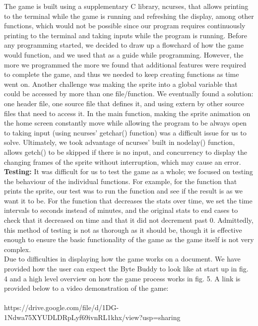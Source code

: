 \documentclass[11pt]{article}
\begin{document}
The game is built using a supplementary C library, ncurses, that allows printing to the terminal while the game is running and refreshing the display, among other functions, which would not be possible since our program requires continuously printing to the terminal and taking inputs while the program is running.
Before any programming started, we decided to draw up a flowchard of how the game would function, and we used that as a guide while programming. However, the more we programmed the more we found that additional features were required to complete the game, and thus we needed to keep creating functions as time went on.
Another challenge was making the sprite into a global variable that could be accessed by more than one file/function. We eventually found a solution: one header file, one source file that defines it, and using extern by other source files that need to access it.
In the main function, making the sprite animation on the home screen constantly move while allowing the program to be always open to taking input (using ncurses’ getchar() function) was a difficult issue for us to solve. Ultimately, we took advantage of ncurses’ built in nodelay() function, allows getch() to be skipped if there is no input, and concurrency to display the changing frames of the sprite without interruption, which may cause an error.\\
\textbf{Testing: }
It was difficult for us to test the game as a whole; we focused on testing the behaviour of the individual functions. For example, for the function that prints the sprite, our test was to run the function and see if the result is as we want it to be. For the function that decreases the stats over time, we set the time intervals to seconds instead of minutes, and the original stats to end cases to check that it decreased on time and that it did not decrement past 0.
Admittedly, this method of testing is not as thorough as it should be, though it is effective enough to ensure the basic functionality of the game as the game itself is not very complex.\\
Due to difficulties in displaying how the game works on a document. We have provided how the user can expect the Byte Buddy to look like at start up in fig. 4 and a high level overview on how the game process works in fig. 5. A link is provided below to a video demonstration of the game:\\\\
https://drive.google.com/file/d/1DG-1Ndwa75XYUDLDRpLyf69ivnRL1khx/view?usp=sharing
\end{document}
